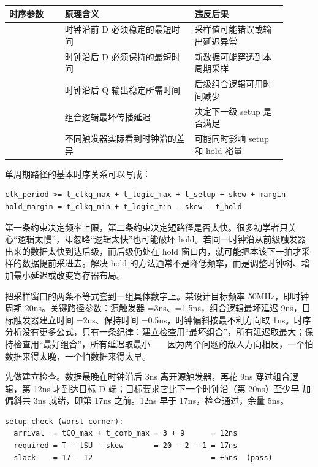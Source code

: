 \begin{longtable}{L{0.18\linewidth}L{0.42\linewidth}L{0.3\linewidth}}
\toprule
时序参数 & 原理含义 & 违反后果 \\
\midrule
{} & 时钟沿前 D 必须稳定的最短时间 & 采样值可能错误或输出延迟异常 \\
 & 时钟沿后 D 必须保持的最短时间 & 新数据可能穿透到本周期采样 \\
 & 时钟沿后 Q 输出稳定所需时间 & 后级组合逻辑可用时间减少 \\
 & 组合逻辑最坏传播延迟 & 决定下一级 setup 是否满足 \\
 & 不同触发器实际看到时钟沿的差异 & 可能同时影响 setup 和 hold 裕量 \\
\bottomrule
\end{longtable}

单周期路径的基本时序关系可以写成：

\begin{lstlisting}
clk_period >= t_clkq_max + t_logic_max + t_setup + skew + margin
hold_margin = t_clkq_min + t_logic_min - skew - t_hold
\end{lstlisting}

第一条约束决定频率上限，第二条约束决定短路径是否太快。很多初学者只关心“逻辑太慢”，却忽略“逻辑太快”也可能破坏 hold。若同一时钟沿从前级触发器出来的数据太快到达后级，而后级仍处在 hold 窗口内，就可能把本该下一拍才采样的数据提前采进去。解决 hold 的方法通常不是降低频率，而是调整时钟树、增加最小延迟或改变寄存器布局。


把采样窗口的两条不等式套到一组具体数字上。某设计目标频率 50MHz，即时钟周期 20ns。关键路径参数：源触发器 =3ns、=1.5ns，组合逻辑最坏延迟 9ns，目标触发器建立时间 =2ns、保持时间 =0.5ns，时钟偏斜按最不利方向取 1ns。时序分析没有更多公式，只有一条纪律：建立检查用“最坏组合”，所有延迟取最大；保持检查用“最好组合”，所有延迟取最小——因为两个问题的敌人方向相反，一个怕数据来得太晚，一个怕数据来得太早。

先做建立检查。数据最晚在时钟沿后 3ns 离开源触发器，再花 9ns 穿过组合逻辑，第 12ns 才到达目标 D 端；目标要求它比下一个时钟沿（第 20ns）至少早  加偏斜共 3ns 就绪，即第 17ns 之前。12ns 早于 17ns，检查通过，余量 5ns。

\begin{lstlisting}
setup check (worst corner):
  arrival  = tCQ_max + t_comb_max = 3 + 9      = 12ns
  required = T - tSU - skew       = 20 - 2 - 1 = 17ns
  slack    = 17 - 12                           = +5ns  (pass)
\end{lstlisting}

